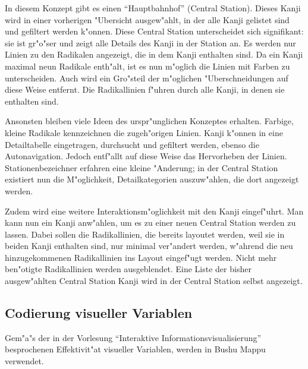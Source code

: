 In diesem Konzept gibt es einen "`Hauptbahnhof"' (Central Station). Dieses Kanji wird in einer vorherigen "Ubersicht ausgew"ahlt, in der alle Kanji gelistet sind und gefiltert werden k"onnen. Diese Central Station unterscheidet sich signifikant: sie ist gr"o"ser und zeigt alle Details des Kanji in der Station an. Es werden nur Linien zu den Radikalen angezeigt, die in dem Kanji enthalten sind. Da ein Kanji maximal neun Radikale enth"alt, ist es nun m"oglich die Linien mit Farben zu unterscheiden. Auch wird ein Gro"steil der m"oglichen "Uberschneidungen auf diese Weise entfernt. Die Radikallinien f"uhren durch alle Kanji, in denen sie enthalten sind.

Ansonsten bleiben viele Ideen des urspr"unglichen Konzeptes erhalten. Farbige, kleine Radikale kennzeichnen die zugeh"origen Linien. Kanji k"onnen in eine Detailtabelle eingetragen, durchsucht und gefiltert werden, ebenso die Autonavigation. Jedoch entf"allt auf diese Weise das Hervorheben der Linien. Stationenbezeichner erfahren eine kleine "Anderung; in der Central Station existiert nun die M"oglichkeit, Detailkategorien auszuw"ahlen, die dort angezeigt werden. 

Zudem wird eine weitere Interaktionsm"oglichkeit mit den Kanji eingef"uhrt. Man kann nun ein Kanji anw"ahlen, um es zu einer neuen Central Station werden zu lassen. Dabei sollen die Radikallinien, die bereits layoutet werden, weil sie in beiden Kanji enthalten sind, nur minimal ver"andert werden, w"ahrend die neu hinzugekommenen Radikallinien ins Layout eingef"ugt werden. Nicht mehr ben"otigte Radikallinien werden ausgeblendet. Eine Liste der bisher ausgew"ahlten Central Station Kanji wird in der Central Station selbst angezeigt.

\subsection{Codierung visueller Variablen}
Gem"a"s der in der Vorlesung "`Interaktive Informationsvisualisierung"' besprochenen Effektivit"at visueller Variablen, werden in Bushu Mappu verwendet. 

